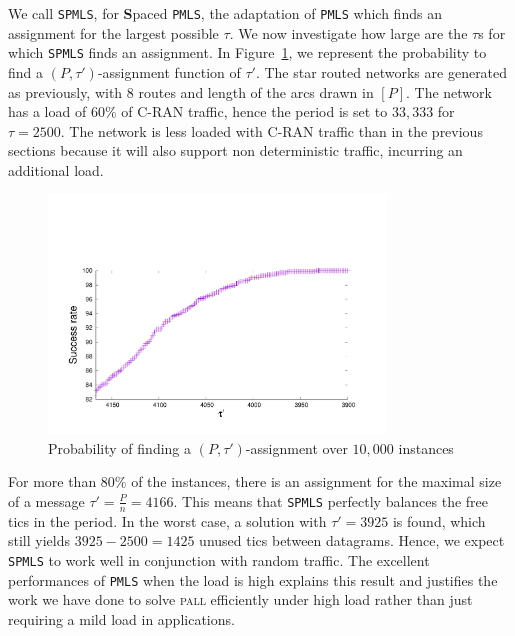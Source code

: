 \documentclass[a4paper,10pt]{article}
\newcommand\PMLS{\texttt{PMLS}\xspace}
\newcommand\SPMLS{\texttt{SPMLS}\xspace}
\newcommand\pall{\textsc{pall}\xspace}
\begin{document}
    We call \SPMLS, for \textbf{S}paced \PMLS, the adaptation of \PMLS which finds an assignment for the largest possible $\tau$. We now investigate how large are the $\tau$s for which \SPMLS finds an assignment. In Figure~\ref{fig:spacetau}, we represent the probability to find a $(P,\tau')$-assignment function of $\tau'$. The star routed networks are generated as previously, with $8$ routes and length of the arcs drawn in $[P]$. The network has a load of $60\%$ of C-RAN traffic, hence the period is set to $33,333$ for $\tau = 2500$. The network is less loaded with C-RAN traffic than in the previous sections because it will also support non deterministic traffic, incurring an additional load.

    \begin{figure}
       \begin{center}
      \includegraphics[width = 0.8\textwidth]{distribtau.pdf}
      \end{center}
      \caption{Probability of finding a $(P,\tau')$-assignment over $10,000$ instances}
      \label{fig:spacetau}   
     \end{figure}   

	For more than $80\%$ of the instances, there is an assignment for the maximal size of a message $\tau' = \frac{P}{n} = 4166$. This means that \SPMLS perfectly balances the free tics in the period. In the worst case, a solution with $\tau' = 3925$ is found, which still yields $3925 - 2500 = 1425$ unused tics between datagrams. Hence, we expect \SPMLS to work well in conjunction with random traffic.
	The excellent performances of \PMLS when the load is high explains this result and justifies the work we have done to solve \pall efficiently under high load rather than just requiring a mild load in applications. 
\end{document}
